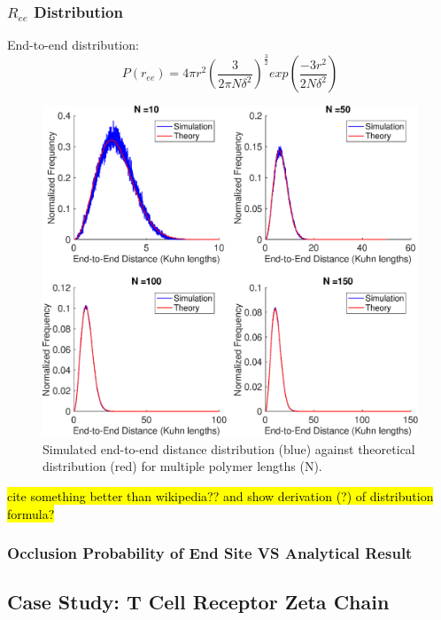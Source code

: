 \documentclass[../AdvancementSummary.tex]{subfiles}
\begin{document}
\subsubsection{$R_{ee}$ Distribution}

End-to-end distribution: \cite{VanValen2009}
\begin{equation*}
P(r_{ee}) = 4\pi r^2 \left( \frac{3}{2\pi N \delta^2}\right)^{\frac{3}{2}}exp\left(\frac{-3r^2}{2N \delta^2}\right)
\end{equation*}


\begin{figure}[H]
\begin{center}
\includegraphics[width=0.8\linewidth]{ModelConfirmationFigures/ReeDistribution.eps}
\caption{Simulated end-to-end distance distribution (blue) against theoretical distribution (red) for multiple polymer lengths (N).}
\end{center}
\end{figure}

\hl{ cite something better than wikipedia?? and show derivation (?) of distribution formula?}

\subsubsection{Occlusion Probability of End Site VS Analytical Result}




\subsection{Case Study: T Cell Receptor Zeta Chain}
\end{document}
